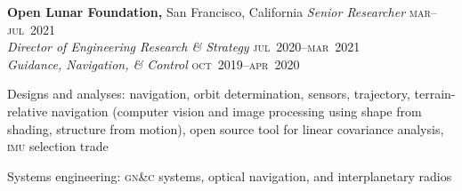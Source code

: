 \documentclass[12pt,letterpaper]{article}
\newenvironment{itemize*}%
{\begin{itemize}%
  \setlength{\itemsep}{0pt}}%
{\end{itemize}}
\newcommand{\rdate}[1]{{\hfill #1}}
\begin{document}
{%
%

\medskip
\textbf{Open Lunar Foundation,} San Francisco, California \newline
\emph{Senior Researcher} \rdate{\textsc{mar}--\textsc{jul}~2021} \\
\emph{Director of Engineering Research \& Strategy} \rdate{\textsc{jul}~2020--\textsc{mar}~2021} \\
\emph{Guidance, Navigation, \& Control} \rdate{\textsc{oct}~2019--\textsc{apr}~2020}
\begin{itemize*}
  \item Designs and analyses: navigation, orbit determination, sensors, trajectory, terrain-relative navigation (computer vision and image processing using shape from shading, structure from motion), open source tool for linear covariance analysis, \textsc{imu} selection trade
  \item Systems engineering: \textsc{gn\&c} systems, optical navigation, and interplanetary radios
\end{itemize*}

}
\end{document}
